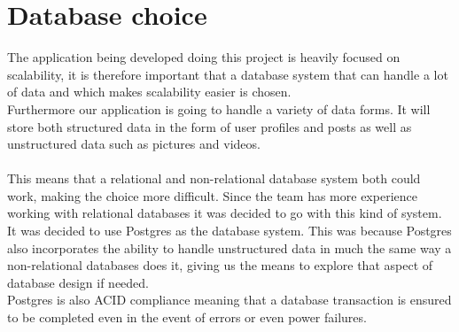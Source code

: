 \section{Database choice}
The application being developed doing this project is heavily focused on scalability, it is therefore important that a database system that can handle a lot of data and which makes scalability easier is chosen.
\\
Furthermore our application is going to handle a variety of data forms. It will store both structured data in the form of user profiles and posts as well as unstructured data such as pictures and videos.
\\
\\
This means that a relational and non-relational database system both could work, making the choice more difficult.
Since the team has more experience working with relational databases it was decided to go with this kind of system.
\\
It was decided to use Postgres as the database system.
This was because Postgres also incorporates the ability to handle unstructured data in much the same way a non-relational databases does it, giving us the means to explore that aspect of database design if needed.
\\
Postgres is also ACID compliance meaning that a database transaction is ensured to be completed even in the event of errors or even power failures.

